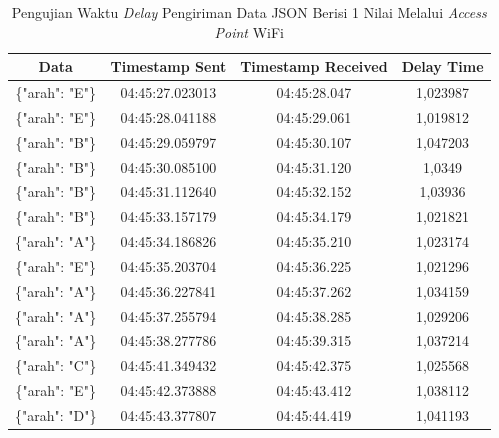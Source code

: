 \begin{table}[htpb]
  \centering
  \caption{Pengujian Waktu \emph{Delay} Pengiriman Data JSON Berisi 1 Nilai Melalui \emph{Access Point} WiFi}
  \label{tbl:delayWiFiJSON1}
  \begin{tabular}{|ccc|c|}
  \hline
  \multicolumn{1}{|c|}{Data}            & \multicolumn{1}{c|}{Timestamp Sent}  & Timestamp Received & Delay Time  \\ \hline
  \multicolumn{1}{|c|}{\{"arah": "E"\}} & \multicolumn{1}{c|}{04:45:27.023013} & 04:45:28.047       & 1,023987    \\ \hline
  \multicolumn{1}{|c|}{\{"arah": "E"\}} & \multicolumn{1}{c|}{04:45:28.041188} & 04:45:29.061       & 1,019812    \\ \hline
  \multicolumn{1}{|c|}{\{"arah": "B"\}} & \multicolumn{1}{c|}{04:45:29.059797} & 04:45:30.107       & 1,047203    \\ \hline
  \multicolumn{1}{|c|}{\{"arah": "B"\}} & \multicolumn{1}{c|}{04:45:30.085100} & 04:45:31.120       & 1,0349      \\ \hline
  \multicolumn{1}{|c|}{\{"arah": "B"\}} & \multicolumn{1}{c|}{04:45:31.112640} & 04:45:32.152       & 1,03936     \\ \hline
  \multicolumn{1}{|c|}{\{"arah": "B"\}} & \multicolumn{1}{c|}{04:45:33.157179} & 04:45:34.179       & 1,021821    \\ \hline
  \multicolumn{1}{|c|}{\{"arah": "A"\}} & \multicolumn{1}{c|}{04:45:34.186826} & 04:45:35.210       & 1,023174    \\ \hline
  \multicolumn{1}{|c|}{\{"arah": "E"\}} & \multicolumn{1}{c|}{04:45:35.203704} & 04:45:36.225       & 1,021296    \\ \hline
  \multicolumn{1}{|c|}{\{"arah": "A"\}} & \multicolumn{1}{c|}{04:45:36.227841} & 04:45:37.262       & 1,034159    \\ \hline
  \multicolumn{1}{|c|}{\{"arah": "A"\}} & \multicolumn{1}{c|}{04:45:37.255794} & 04:45:38.285       & 1,029206    \\ \hline
  \multicolumn{1}{|c|}{\{"arah": "A"\}} & \multicolumn{1}{c|}{04:45:38.277786} & 04:45:39.315       & 1,037214    \\ \hline
  \multicolumn{1}{|c|}{\{"arah": "C"\}} & \multicolumn{1}{c|}{04:45:41.349432} & 04:45:42.375       & 1,025568    \\ \hline
  \multicolumn{1}{|c|}{\{"arah": "E"\}} & \multicolumn{1}{c|}{04:45:42.373888} & 04:45:43.412       & 1,038112    \\ \hline
  \multicolumn{1}{|c|}{\{"arah": "D"\}} & \multicolumn{1}{c|}{04:45:43.377807} & 04:45:44.419       & 1,041193    \\ \hline

\end{tabular}
\end{table}
